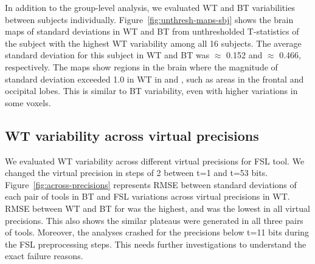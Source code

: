 \documentclass[conference]{IEEEtran}
\begin{document}
  In addition to the group-level analysis, we evaluated WT and BT variabilities between subjects individually.
  Figure~\ref{fig:unthresh-maps-sbj} shows the brain maps of standard deviations in WT and BT from unthresholded T-statistics of
  the subject with the highest WT variability among all 16 subjects.
  The average standard deviation for this subject in WT and BT was $\approx$ 0.152 and $\approx$ 0.466, respectively.
  The maps show regions in the brain where the magnitude of standard deviation exceeded 1.0 in WT in \fslafni and \afnispm,
  such as areas in the frontal and occipital lobes.
  This is similar to BT variability, even with higher variations in some voxels.


\begin{figure}[ht]
\end{figure}

\subsection{WT variability across virtual precisions}

We evaluated WT variability across different virtual precisions for FSL tool.
We changed the virtual precision in steps of 2 between t=1 and t=53 bits.
Figure~\ref{fig:across-precisions} represents RMSE between standard deviations of each pair of tools in BT and FSL variations across virtual precisions in WT.
RMSE between WT and BT for \fslafni was the highest, and \fslspm was the lowest in all virtual precisions.
This also shows the similar plateaus were generated in all three pairs of tools.
Moreover, the analyses crashed for the precisions below t=11 bits during the FSL preprocessing steps. 
This needs further investigations to understand the exact failure reasons. 
\end{document}
